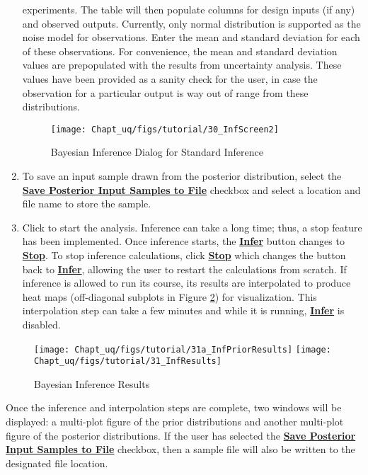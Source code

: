 \begin{enumerate}
{  experiments. The table will then populate columns for design inputs (if
  any) and observed outputs. Currently, only normal distribution is
  supported as the noise model for observations. Enter the mean and standard deviation for each of these observations.
  For convenience,
  the mean and standard deviation values are prepopulated with the results from uncertainty analysis. These
  values have been provided as a sanity check for the user, in case the
  observation for a particular output is way out of range from these
  distributions.
\begin{figure}[H]
\centering \texttt{[image: Chapt\_uq/figs/tutorial/30\_InfScreen2]}
\caption{Bayesian Inference Dialog for Standard Inference}
\label{fig:uqt_infer}
\end{figure}
}
\item{To save an input sample drawn from the posterior distribution,
  select the \textbf{\underline{Save Posterior Input Samples to File}} checkbox and
  select a location and file name to store the sample.}
\item{Click  to start the analysis. Inference can take a long
  time; thus, a stop feature has been implemented. Once inference starts,
  the \textbf{\underline{Infer}} button changes to \textbf{\underline{Stop}}. To stop inference
  calculations, click \textbf{\underline{Stop}} which changes the button back to \textbf{\underline{Infer}},
  allowing the user to restart the calculations from scratch. If inference
  is allowed to run its course, its results are interpolated to produce
  heat maps (off-diagonal subplots in Figure \ref{fig:uqt_infer_results}) for
  visualization. This interpolation step can take a few minutes and while
  it is running, \textbf{\underline{Infer}} is disabled.}
\end{enumerate}

\begin{figure}[H]
\centering
\texttt{[image: Chapt\_uq/figs/tutorial/31a\_InfPriorResults]}
\centering
\texttt{[image: Chapt\_uq/figs/tutorial/31\_InfResults]}
\caption{Bayesian Inference Results}
\label{fig:uqt_infer_results}
\end{figure}

Once the inference and interpolation steps are complete, two windows will
be displayed: a multi-plot figure of the prior distributions and another
multi-plot figure of the posterior distributions. 
If the user has selected the \textbf{\underline{Save Posterior Input Samples to File}} checkbox,
then a sample file will also be written to the designated file location.

